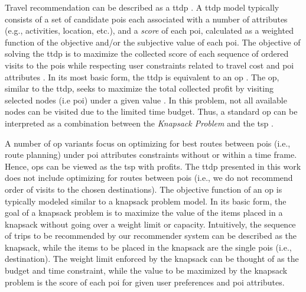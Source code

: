 Travel recommendation can be described as a \gls{ttdp} \parencite{Vansteenwegen2007TheOpportunity}. A \gls{ttdp} model typically consists of a set of candidate \glspl{poi} each associated with a number of attributes (e.g., activities, location, etc.), and a \textit{score} of each \gls{poi}, calculated as a weighted function of the objective and/or the subjective value of each \gls{poi}. The objective of solving the \gls{ttdp} is to maximize the collected score of each sequence of ordered visits to the \glspl{poi} while respecting user constraints related to travel cost and \gls{poi} attributes \parencite{Survey_TTDP_Guavalas}. In its most basic form, the \gls{ttdp} is equivalent to an \gls{op} \parencite{Vansteenwegen2007TheOpportunity}. The \gls{op}, similar to the \gls{ttdp}, seeks to maximize the total collected profit by visiting selected nodes (i.e \gls{poi}) under a given value \parencite{T.1984HeuristicOrienteering}. In this problem, not all available nodes can be visited due to the limited time budget. Thus, a standard \gls{op} can be interpreted as a combination between the \textit{Knapsack Problem} and the \gls{tsp} \parencite{OP_Solution_Gunawan}. 

A number of \gls{op} variants focus on optimizing for best routes between \glspl{poi} (i.e., route planning) under \gls{poi} attributes constraints without or within a time frame. Hence, \glspl{op} can be viewed as the \gls{tsp} with profits. The \gls{ttdp} presented in this work does not include optimizing for routes between \glspl{poi} (i.e., we do not recommend order of visits to the chosen destinations). The objective function of an \gls{op} is typically modeled similar to a knapsack problem model. In its basic form, the goal of a knapsack problem is to maximize the value of the items placed in a knapsack without going over a weight limit or capacity. Intuitively, the sequence of trips to be recommended by our recommender system can be described as the knapsack, while the items to be placed in the knapsack are the single \glspl{poi} (i.e., destination). The weight limit enforced by the knapsack can be thought of as the budget and time constraint, while the value to be maximized by the knapsack problem is the score of each \gls{poi} for given user preferences and \gls{poi} attributes.

